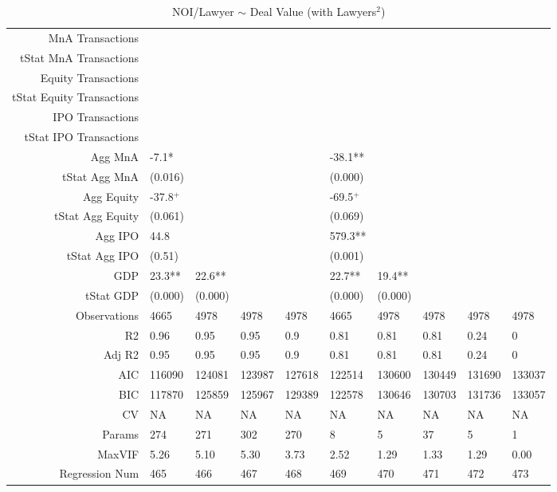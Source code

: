 \begin{table}[ht]
\begin{tabular}{rlllllllll}
  MnA Transactions &  &  &  &  &  &  &  &  &  \\ 
  tStat MnA Transactions &  &  &  &  &  &  &  &  &  \\ 
  Equity Transactions &  &  &  &  &  &  &  &  &  \\ 
  tStat Equity Transactions &  &  &  &  &  &  &  &  &  \\ 
  IPO Transactions &  &  &  &  &  &  &  &  &  \\ 
  tStat IPO Transactions &  &  &  &  &  &  &  &  &  \\ 
  Agg MnA & -7.1* &  &  &  & -38.1** &  &  &  &  \\ 
  tStat Agg MnA & (0.016) &  &  &  & (0.000) &  &  &  &  \\ 
  Agg Equity & -37.8$^{+}$ &  &  &  & -69.5$^{+}$ &  &  &  &  \\ 
  tStat Agg Equity & (0.061) &  &  &  & (0.069) &  &  &  &  \\ 
  Agg IPO & 44.8 &  &  &  & 579.3** &  &  &  &  \\ 
  tStat Agg IPO & (0.51) &  &  &  & (0.001) &  &  &  &  \\ 
  GDP & 23.3** & 22.6** &  &  & 22.7** & 19.4** &  &  &  \\ 
  tStat GDP & (0.000) & (0.000) &  &  & (0.000) & (0.000) &  &  &  \\ 
  Observations & 4665 & 4978 & 4978 & 4978 & 4665 & 4978 & 4978 & 4978 & 4978 \\ 
  R2 & 0.96 & 0.95 & 0.95 & 0.9 & 0.81 & 0.81 & 0.81 & 0.24 & 0 \\ 
  Adj R2 & 0.95 & 0.95 & 0.95 & 0.9 & 0.81 & 0.81 & 0.81 & 0.24 & 0 \\ 
  AIC & 116090 & 124081 & 123987 & 127618 & 122514 & 130600 & 130449 & 131690 & 133037 \\ 
  BIC & 117870 & 125859 & 125967 & 129389 & 122578 & 130646 & 130703 & 131736 & 133057 \\ 
  CV & NA & NA & NA & NA & NA & NA & NA & NA & NA \\ 
  Params & 274 & 271 & 302 & 270 & 8 & 5 & 37 & 5 & 1 \\ 
  MaxVIF & 5.26 & 5.10 & 5.30 & 3.73 & 2.52 & 1.29 & 1.33 & 1.29 & 0.00 \\ 
  Regression Num & 465 & 466 & 467 & 468 & 469 & 470 & 471 & 472 & 473 \\ 
   \hline
\end{tabular}
\caption{NOI/Lawyer $\sim$ Deal Value (with Lawyers$^2$)} 
\end{table}
